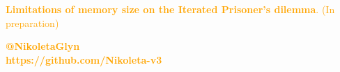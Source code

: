 \documentclass{beamer}
\begin{document}
\begin{frame}
    \centering
    \large{\textcolor{orange}{\textbf{Limitations of memory size on the Iterated Prisoner's dilemma}. (In preparation)}} \\
    \vspace{2cm}

    \large \textbf{\textcolor{orange}{{@NikoletaGlyn}}}\\
    \large \textbf{\textcolor{orange}{{https://github.com/Nikoleta-v3}}}\\
\end{frame}
\end{document}
